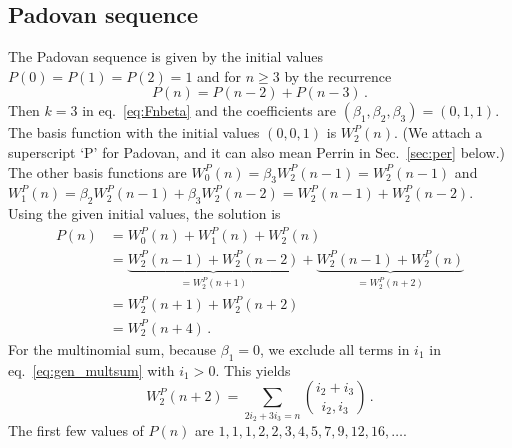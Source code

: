 \documentclass[review]{elsarticle}
\theoremstyle{plain}
\begin{document}
\subsection{Padovan sequence}\label{sec:pad}
The Padovan sequence is given by the initial values $P(0)=P(1)=P(2)=1$ and for $n\ge3$ by the recurrence
\begin{equation}
\label{eq:Padovan_rec}  
P(n) = P(n-2) + P(n-3) \,.
\end{equation}
Then $k=3$ in eq.~\eqref{eq:Fnbeta} and the coefficients are
$(\beta_1,\beta_2,\beta_3)=(0,1,1)$.
The basis function with the initial values $(0,0,1)$ is $W^P_2(n)$.
(We attach a superscript `P' for Padovan, and it can also mean Perrin in Sec.~\ref{sec:per} below.)
The other basis functions are
$W^P_0(n)=\beta_3W^P_2(n-1)=W^P_2(n-1)$
and
$W^P_1(n)=\beta_2W^P_2(n-1)+\beta_3W^P_2(n-2) =W^P_2(n-1)+W^P_2(n-2)$.
Using the given initial values, the solution is
\begin{equation}
\begin{split}
P(n) &= W^P_0(n) +W^P_1(n) +W^P_2(n)
\\
&= \underbrace{W^P_2(n-1) +W^P_2(n-2)}_{=W^P_2(n+1)} + \underbrace{W^P_2(n-1) +W^P_2(n)}_{=W^P_2(n+2)}
\\
&= W^P_2(n+1) +W^P_2(n+2)
\\
&= W^P_2(n+4) \,.
\end{split}
\end{equation}
For the multinomial sum,
because $\beta_1=0$, we exclude all terms in $i_1$ in eq.~\eqref{eq:gen_multsum} with $i_1>0$.
This yields
\begin{equation}
\label{eq:F_Padovan}
W^P_2(n+2) = \sum_{2i_2+3i_3=n} \binom{i_2+i_3}{i_2,i_3} \,.
\end{equation}
The first few values of $P(n)$ are $1,1,1,2,2,3,4,5,7,9,12,16,\dots$.
\end{document}
